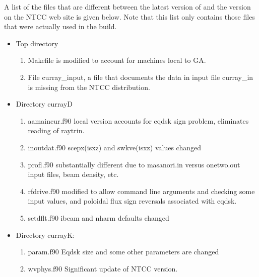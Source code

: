  A list of the files that  are different between the latest version of 
 \ct and the version on the NTCC web site is given below. Note
 that this list only contains those files that were actually used in
 the build.
\begin{itemize}
 \item Top directory
    \begin{enumerate}
 \item Makefile  is modified to account for machines local to GA.
 \item {File curray\_input, a file that documents  the data in input
   file curray\_in is missing from the NTCC distribution.} 
\end{enumerate}
 \item Directory currayD 
    \begin{enumerate}
     \item   aamaincur.f90 local version accounts for eqdsk sign
       problem, eliminates reading of raytrin.
     \item   inoutdat.f90 scepx(isxz) and swkve(isxz) values changed
     \item   profl.f90  substantially different due to masanori.in versus
        onetwo.out input files, beam density, etc. 
     \item   rfdrive.f90 modified to allow command line
       arguments and checking some input values, and poloidal flux sign
       reversals associated with eqdsk.
     \item   setdflt.f90 ibeam and nharm defaults changed
 \end{enumerate}
\item{Directory currayK}:
    \begin{enumerate}
     \item   param.f90  Eqdsk size and some other parameters are changed
     \item   wvphys.f90 Significant update of NTCC version.
 \end{enumerate}
\end{itemize}
